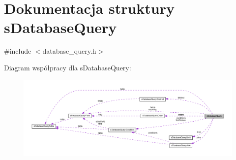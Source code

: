 \hypertarget{structsDatabaseQuery}{}\section{Dokumentacja struktury s\+Database\+Query}
\label{structsDatabaseQuery}


{\ttfamily \#include $<$database\+\_\+query.\+h$>$}



Diagram współpracy dla s\+Database\+Query\+:\nopagebreak
\begin{figure}[H]
\begin{center}
\leavevmode
\includegraphics[width=350pt]{structsDatabaseQuery__coll__graph}
\end{center}
\end{figure}

